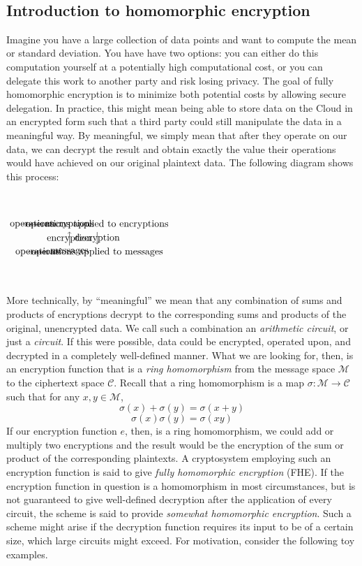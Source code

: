 \documentclass[11pt]{report}
\newcommand{\M}{\mathcal{M}}
\begin{document}
\

\subsection{Introduction to homomorphic encryption}

Imagine you have a large collection of data points and want to compute the mean or standard deviation. You have have two options: you can either do this computation yourself at a potentially high computational cost, or you can delegate this work to another party and risk losing privacy.  The goal of fully homomorphic encryption is to minimize both potential costs by allowing secure delegation. In practice, this might mean being able to store data on the Cloud in an encrypted form such that a third party could still manipulate the data in a meaningful way. By meaningful, we simply mean that after they operate on our data, we can decrypt the result and obtain exactly the value their operations would have achieved on our original plaintext data. The following diagram shows this process:

\

$\begin{tikzpicture}
\node (m) {messages};
\node (fm) [right of=m] {operations applied to messages};
\node (em) [above of=m] {encryptions};
\node (fem) [right of=em] {operations applied to encryptions};
\draw[->] (m) to node {operations} (fm);
\draw[->] (fem) to node {decryption} (fm);
\draw[->] (m) to node {encryption} (em);
\draw[->] (em) to node {operations} (fem);
\end{tikzpicture}$

\

More technically, by ``meaningful'' we mean that any combination of sums and products of encryptions decrypt to the corresponding sums and products of the original, unencrypted data. We call such a combination an \emph{arithmetic circuit}, or just a \emph{circuit}. If this were possible, data could be encrypted, operated upon, and decrypted in a completely well-defined manner. What we are looking for, then, is an encryption function that is a \emph{ring homomorphism} from the message space $\M$ to the ciphertext space $\mathcal{C}$. Recall that a ring homomorphism is a map $\sigma: \M \rightarrow \mathcal{C}$ such that for any $x,y\in \M$, \[\sigma(x)+\sigma(y) = \sigma(x+y)\] \[\sigma(x) \sigma(y) = \sigma(xy)\] If our encryption function $e$, then, is a ring homomorphism, we could add or multiply two encryptions and the result would be the encryption of the sum or product of the corresponding plaintexts. A cryptosystem employing such an encryption function is said to give \emph{fully homomorphic encryption} (FHE). If the encryption function in question is a homomorphism in most circumstances, but is not guaranteed to give well-defined decryption after the application of every circuit, the scheme is said to provide \emph{somewhat homomorphic encryption}. Such a scheme might arise if the decryption function requires its input to be of a certain size, which large circuits might exceed. For motivation, consider the following toy examples.
\end{document}
